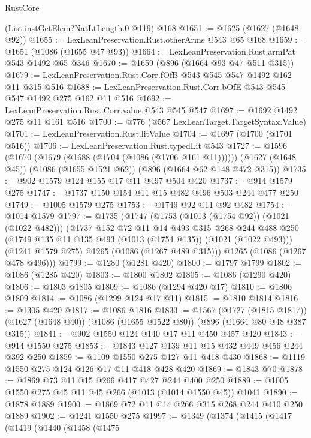 \begin{lexlean}{RustCore}
\begin{coremodule}
{\begin{coremodule}
{{{{{{    (List.instGetElem?NatLtLength.{0} @119)
    @168
@1651 := @1625 (@1627 (@1648 @92))
@1655 := LexLeanPreservation.Rust.otherArms @543 @65 @168
@1659 := @1651 (@1086 (@1655 @47 @93))
@1664 := LexLeanPreservation.Rust.armPat @543 @1492 @65 @346
@1670 := @1659 (@896 (@1664 @93 @47 @511 @315))
@1679 := LexLeanPreservation.Rust.Corr.fOfB @543 @545 @547 @1492 @162 @11 @315 @516
@1688 := LexLeanPreservation.Rust.Corr.bOfE @543 @545 @547 @1492 @275 @162 @11 @516
@1692 := LexLeanPreservation.Rust.Corr.value @543 @545 @547
@1697 := @1692 @1492 @275 @11 @161 @516
@1700 := @776 (@567 LexLeanTarget.TargetSyntax.Value)
@1701 := LexLeanPreservation.Rust.litValue
@1704 := @1697 (@1700 (@1701 @516))
@1706 := LexLeanPreservation.Rust.typedLit @543
@1727 := @1596
    (@1670 (@1679 (@1688 (@1704 (@1086 (@1706 @161 @11))))))
    (@1627 (@1648 @45))
    (@1086 (@1655 @1521 @62))
    (@896 (@1664 @62 @148 @472 @315))
@1735 := @902 @1579 @124 @155 @17 @11 @497 @504 @420
@1737 := @914 @1579 @275
@1747 := @1737 @150 @154 @11 @15 @482 @496 @503 @244 @477 @250
@1749 := @1005 @1579 @275
@1753 := @1749 @92 @11 @92 @482
@1754 := @1014 @1579
@1797 := @1735
    (@1747
      (@1753 (@1013 (@1754 @92)) (@1021 (@1022 @482)))
      (@1737
        @152
        @72
        @11
        @14
        @493
        @315
        @268
        @244
        @488
        @250
        (@1749 @135 @11 @135 @493 (@1013 (@1754 @135)) (@1021 (@1022 @493)))
        (@1241 @1579 @275)
        @1265
        (@1086 (@1267 @489 @315)))
      @1265
      (@1086 (@1267 @478 @496)))
@1799 := @1280 (@1281 @420)
@1800 := @1797 @1799
@1802 := @1086 (@1285 @420)
@1803 := @1800 @1802
@1805 := @1086 (@1290 @420)
@1806 := @1803 @1805
@1809 := @1086 (@1294 @420 @17)
@1810 := @1806 @1809
@1814 := @1086 (@1299 @124 @17 @11)
@1815 := @1810 @1814
@1816 := @1305 @420
@1817 := @1086 @1816
@1833 := @1567
    (@1727 (@1815 @1817))
    (@1627 (@1648 @40))
    (@1086 (@1655 @1522 @80))
    (@896 (@1664 @80 @48 @387 @315))
@1841 := @902 @1550 @124 @140 @17 @11 @450 @457 @420
@1843 := @914 @1550 @275
@1853 := @1843 @127 @139 @11 @15 @432 @449 @456 @244 @392 @250
@1859 := @1109 @1550 @275 @127 @11 @418 @430
@1868 := @1119 @1550 @275 @124 @126 @17 @11 @418 @428 @420
@1869 := @1843 @70
@1878 := @1869 @73 @11 @15 @266 @417 @427 @244 @400 @250
@1889 := @1005 @1550 @275 @45 @11 @45 @266 (@1013 (@1014 @1550 @45)) @1041
@1890 := @1878 @1889
@1900 := @1869 @72 @11 @14 @266 @315 @268 @244 @410 @250 @1889
@1902 := @1241 @1550 @275
@1997 := @1349
    (@1374
      (@1415
        (@1417
          (@1419
            (@1440
              (@1458
                (@1475
}}}}}}
\end{coremodule}}
\end{coremodule}
\end{lexlean}
